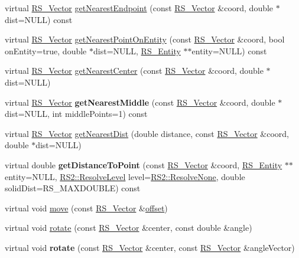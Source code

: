 \begin{DoxyCompactItemize}
\item 
virtual \hyperlink{classRS__Vector}{R\-S\-\_\-\-Vector} \hyperlink{classRS__ConstructionLine_abf9b0a1ca4911f9e9992d459f8bb9ebc}{get\-Nearest\-Endpoint} (const \hyperlink{classRS__Vector}{R\-S\-\_\-\-Vector} \&coord, double $\ast$dist=N\-U\-L\-L) const 
\item 
virtual \hyperlink{classRS__Vector}{R\-S\-\_\-\-Vector} \hyperlink{classRS__ConstructionLine_a786f8e6c5206865329cb6f370c40db6f}{get\-Nearest\-Point\-On\-Entity} (const \hyperlink{classRS__Vector}{R\-S\-\_\-\-Vector} \&coord, bool on\-Entity=true, double $\ast$dist=N\-U\-L\-L, \hyperlink{classRS__Entity}{R\-S\-\_\-\-Entity} $\ast$$\ast$entity=N\-U\-L\-L) const 
\item 
virtual \hyperlink{classRS__Vector}{R\-S\-\_\-\-Vector} \hyperlink{classRS__ConstructionLine_a86dc72b937c3c49fdf29b8f9bf670bb4}{get\-Nearest\-Center} (const \hyperlink{classRS__Vector}{R\-S\-\_\-\-Vector} \&coord, double $\ast$dist=N\-U\-L\-L)
\item 
\hypertarget{classRS__ConstructionLine_aff25cbe5c9371a5615f2befbd4e8c39f}{virtual \hyperlink{classRS__Vector}{R\-S\-\_\-\-Vector} {\bfseries get\-Nearest\-Middle} (const \hyperlink{classRS__Vector}{R\-S\-\_\-\-Vector} \&coord, double $\ast$dist=N\-U\-L\-L, int middle\-Points=1) const }\label{classRS__ConstructionLine_aff25cbe5c9371a5615f2befbd4e8c39f}

\item 
virtual \hyperlink{classRS__Vector}{R\-S\-\_\-\-Vector} \hyperlink{classRS__ConstructionLine_a54ac24f2f5071333243944d75280697f}{get\-Nearest\-Dist} (double distance, const \hyperlink{classRS__Vector}{R\-S\-\_\-\-Vector} \&coord, double $\ast$dist=N\-U\-L\-L)
\item 
\hypertarget{classRS__ConstructionLine_aad13844e42286b5e679c5237a22264aa}{virtual double {\bfseries get\-Distance\-To\-Point} (const \hyperlink{classRS__Vector}{R\-S\-\_\-\-Vector} \&coord, \hyperlink{classRS__Entity}{R\-S\-\_\-\-Entity} $\ast$$\ast$entity=N\-U\-L\-L, \hyperlink{classRS2_a1b2c5e3a3e9d1b03a9564229255faa20}{R\-S2\-::\-Resolve\-Level} level=\hyperlink{classRS2_a1b2c5e3a3e9d1b03a9564229255faa20aecb7396f39bc313ad8903c8a5fac5a50}{R\-S2\-::\-Resolve\-None}, double solid\-Dist=R\-S\-\_\-\-M\-A\-X\-D\-O\-U\-B\-L\-E) const }\label{classRS__ConstructionLine_aad13844e42286b5e679c5237a22264aa}

\item 
virtual void \hyperlink{classRS__ConstructionLine_a8c6ec29f8e7d2dffcbe6acda1ff74168}{move} (const \hyperlink{classRS__Vector}{R\-S\-\_\-\-Vector} \&\hyperlink{classRS__AtomicEntity_ab708a0d05c11fd7eff646243db60464a}{offset})
\item 
virtual void \hyperlink{classRS__ConstructionLine_a628e7899dba8fd60dfa38d4611c1bd7b}{rotate} (const \hyperlink{classRS__Vector}{R\-S\-\_\-\-Vector} \&center, const double \&angle)
\item 
\hypertarget{classRS__ConstructionLine_a9bd6324afb015d8ea3c6c24624c2acf0}{virtual void {\bfseries rotate} (const \hyperlink{classRS__Vector}{R\-S\-\_\-\-Vector} \&center, const \hyperlink{classRS__Vector}{R\-S\-\_\-\-Vector} \&angle\-Vector)}\label{classRS__ConstructionLine_a9bd6324afb015d8ea3c6c24624c2acf0}


\end{DoxyCompactItemize}

